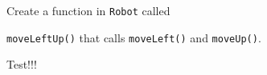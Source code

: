 Create a function in \texttt{Robot} called

\texttt{moveLeftUp()} that calls \texttt{moveLeft()} and \texttt{moveUp()}.

Test!!!

